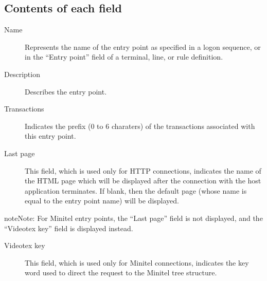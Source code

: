 \documentclass[letterpaper,10pt,english]{sphinxmanual}
\begin{document}



\subsection{Contents of each field}
\label{\detokenize{connectivity_guide:id10}}\begin{description}
\item[{Name}] \leavevmode
Represents the name of the entry point as specified in a logon sequence, or in the “Entry point” field of a terminal, line, or rule definition.

\item[{Description}] \leavevmode
Describes the entry point.

\item[{Transactions}] \leavevmode
Indicates the prefix (0 to 6 charaters) of the transactions associated with this entry point.

\item[{Last page}] \leavevmode
This field, which is used only for HTTP connections, indicates the name of the HTML page which will be displayed after the connection with the host application terminates. If blank, then the default page (whose name is equal to the entry point name) will be displayed.

\end{description}

\begin{sphinxadmonition}{note}{Note:}
For Minitel entry points, the “Last page” field is not displayed, and the “Videotex key” field is displayed instead.
\end{sphinxadmonition}
\begin{description}
\item[{Videotex key}] \leavevmode
This field, which is used only for Minitel connections, indicates the key word used to direct the request to the Minitel tree structure.

\end{description}
\end{document}
